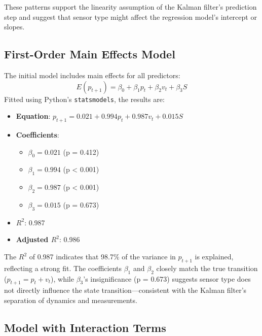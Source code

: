 \documentclass[12pt]{article}
\begin{document}
These patterns support the linearity assumption of the Kalman filter’s prediction step and suggest that sensor type might affect the regression model’s intercept or slopes.

\subsection{First-Order Main Effects Model}
\label{subsec:first-order}

The initial model includes main effects for all predictors:
\[
E(p_{t+1}) = \beta_0 + \beta_1 p_t + \beta_2 v_t + \beta_3 S
\]
Fitted using Python’s \texttt{statsmodels}, the results are:
\begin{itemize}
    \item \textbf{Equation}: \( p_{t+1} = 0.021 + 0.994 p_t + 0.987 v_t + 0.015 S \)
    \item \textbf{Coefficients}:
    \begin{itemize}
        \item \( \beta_0 = 0.021 \) (p = 0.412)
        \item \( \beta_1 = 0.994 \) (p < 0.001)
        \item \( \beta_2 = 0.987 \) (p < 0.001)
        \item \( \beta_3 = 0.015 \) (p = 0.673)
    \end{itemize}
    \item \textbf{\( R^2 \)}: 0.987
    \item \textbf{Adjusted \( R^2 \)}: 0.986
\end{itemize}

The \( R^2 \) of 0.987 indicates that 98.7\% of the variance in \( p_{t+1} \) is explained, reflecting a strong fit. The coefficients \( \beta_1 \) and \( \beta_2 \) closely match the true transition (\( p_{t+1} = p_t + v_t \)), while \( \beta_3 \)’s insignificance (p = 0.673) suggests sensor type does not directly influence the state transition—consistent with the Kalman filter’s separation of dynamics and measurements.

\subsection{Model with Interaction Terms}
\label{subsec:interaction}
\end{document}
